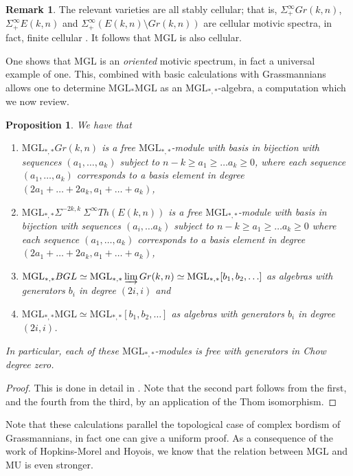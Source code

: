 \documentclass[oneside,a4paper]{amsart}
\newcommand{\MU}{\mathrm{MU}} %
\newcommand{\MGL}{\mathrm{MGL}} %
\theoremstyle{plain}
\newtheorem{prop}[thm]{Proposition}
\theoremstyle{definition}
\newtheorem{rem}[thm]{Remark}
\theoremstyle{remark}
\begin{document}
\begin{rem}
\label{rem:grassmanians_stably_cellular}
The relevant varieties are all stably cellular; that is, $\Sigma^{\infty} _{+} Gr(k, n)$, $\Sigma^{\infty} _{+} E(k, n)$ and $\Sigma^{\infty}_{+} (E(k, n) \setminus Gr(k, n))$ are cellular motivic spectra, in fact, finite cellular \cite{dugger2005motivic}. It follows that $\MGL$ is also cellular.
\end{rem}
One shows that $\MGL$ is an \emph{oriented} motivic spectrum, in fact a universal example of one. This, combined with basic calculations with Grassmannians allows one to determine $\MGL_{*}\MGL$ as an $\MGL_{*, *}$-algebra, a computation which we now review.

\begin{prop}
\label{prop:mgl_of_grassmanians}
We have that 
\begin{enumerate}
\item $\MGL_{*, *} Gr(k, n)$ is a free $\MGL_{*, *}$-module with basis in bijection with sequences $(a_{1}, \ldots, a_{k})$ subject to $n-k \geq a_{1} \geq \ldots a_{k} \geq 0$, where each sequence $(a_{1}, \ldots, a_{k})$ corresponds to a basis element in degree $(2a_{1} + \ldots + 2a_{k}, a_{1} + \ldots + a_{k})$,
\item $\MGL_{*, *} \Sigma ^{-2k, k} \ \Sigma^{\infty} Th(E(k, n))$ is a free $\MGL_{*, *}$-module with basis in bijection with sequences $(a_{i}, \ldots a_{k})$ subject to $n-k \geq a_{1} \geq \ldots a_{k} \geq 0$ where each sequence $(a_{1}, \ldots, a_{k})$ corresponds to a basis element in degree $(2a_{1} + \ldots + 2a_{k}, a_{1} + \ldots + a_{k})$,
\item $\MGL_{*, *} BGL \simeq \MGL_{*, *} \varinjlim Gr(k, n) \simeq \MGL_{*, *}[b_{1}, b_{2}, \ldots]$ as algebras with generators $b_{i}$ in degree $(2i, i)$ and
\item $\MGL_{*, *} \MGL \simeq  \MGL_{*, *}[b_{1}, b_{2}, \ldots]$ as algebras with generators $b_{i}$ in degree $(2i, i)$.
\end{enumerate}
In particular, each of these $\MGL_{*,*}$-modules is free with generators in Chow degree zero. 
\end{prop}

\begin{proof}
This is done in detail in \cite[6.2]{naumann2009motivic}. Note that the second part follows from the first, and the fourth from the third, by an application of the Thom isomorphism. 
\end{proof}
Note that these calculations parallel the topological case of complex bordism of Grassmannians, in fact one can give a uniform proof. As a consequence of the work of Hopkins-Morel and Hoyois, we know that the relation between $\MGL$ and $\MU$ is even stronger. 
\end{document}
